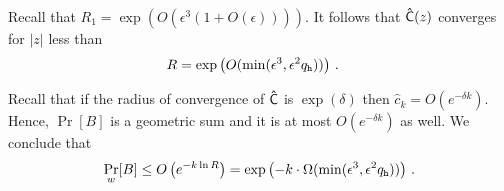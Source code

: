   Recall that $R_1 = \exp\left(O(\epsilon^3 (1 + O(\epsilon)))\right)$. 
  It follows that $\mathsf{\hat{C}}(z)$ converges for 
  $|z|$ less than 
  \begin{align}\label{eq:RoC-unique-honest}
    R &= \exp\left(O(\min(\epsilon^3, \epsilon^2 q_{\mathtt{h}}))\right)
    \,.
  \end{align}

  Recall that if the radius of convergence of
  $\mathsf{\hat{C}}$ is $\exp(\delta)$ then 
  $\hat{c}_k = O(e^{-\delta k})$. 
  Hence, $\Pr[B]$ is a geometric sum and it is 
  at most $O(e^{-\delta k})$ as well. 
  We conclude that 
  $$
    \Pr_w[B] 
      \leq O\left(e^{-k \ln R }\right)
      = \exp\left(-k\cdot \Omega(\min(\epsilon^3, \epsilon^2 q_{\mathtt{h}}))\right)
      \,.
  $$




